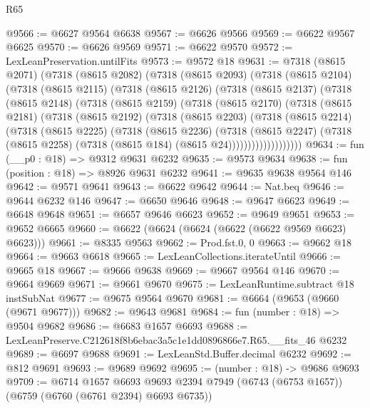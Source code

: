 \begin{lexlean}{R65}
\begin{coremodule}
{@9566 := @6627 @9564 @6638
@9567 := @6626 @9566
@9569 := @6622 @9567 @6625
@9570 := @6626 @9569
@9571 := @6622 @9570
@9572 := LexLeanPreservation.untilFits
@9573 := @9572 @18
@9631 := @7318
    (@8615 @2071)
    (@7318
      (@8615 @2082)
      (@7318
        (@8615 @2093)
        (@7318
          (@8615 @2104)
          (@7318
            (@8615 @2115)
            (@7318
              (@8615 @2126)
              (@7318
                (@8615 @2137)
                (@7318
                  (@8615 @2148)
                  (@7318
                    (@8615 @2159)
                    (@7318
                      (@8615 @2170)
                      (@7318
                        (@8615 @2181)
                        (@7318
                          (@8615 @2192)
                          (@7318
                            (@8615 @2203)
                            (@7318
                              (@8615 @2214)
                              (@7318
                                (@8615 @2225)
                                (@7318
                                  (@8615 @2236)
                                  (@7318
                                    (@8615 @2247)
                                    (@7318
                                      (@8615 @2258)
                                      (@7318 (@8615 @184) (@8615 @24)))))))))))))))))))
@9634 := fun (__p0 : @18) => @9312 @9631 @6232
@9635 := @9573 @9634
@9638 := fun (position : @18) => @8926 @9631 @6232
@9641 := @9635 @9638 @9564 @146
@9642 := @9571 @9641
@9643 := @6622 @9642
@9644 := Nat.beq
@9646 := @9644 @6232 @146
@9647 := @6650 @9646
@9648 := @9647 @6623
@9649 := @6648 @9648
@9651 := @6657 @9646 @6623
@9652 := @9649 @9651
@9653 := @9652 @6665
@9660 := @6622 (@6624 (@6624 (@6622 (@6622 @9569 @6623) @6623)))
@9661 := @8335 @9563
@9662 := Prod.fst.{0, 0}
@9663 := @9662 @18
@9664 := @9663 @6618
@9665 := LexLeanCollections.iterateUntil
@9666 := @9665 @18
@9667 := @9666 @9638
@9669 := @9667 @9564 @146
@9670 := @9664 @9669
@9671 := @9661 @9670
@9675 := LexLeanRuntime.subtract @18 instSubNat
@9677 := @9675 @9564 @9670
@9681 := @6664 (@9653 (@9660 (@9671 @9677)))
@9682 := @9643 @9681
@9684 := fun (number : @18) => @9504 @9682
@9686 := @6683 @1657 @6693
@9688 := LexLeanPreserve.C212618f8b6ebac3a5c1e1dd0896866e7.R65.__fits_46 @6232
@9689 := @6697 @9688
@9691 := LexLeanStd.Buffer.decimal @6232
@9692 := @812 @9691
@9693 := @9689 @9692
@9695 := (number : @18) -> @9686 @9693
@9709 := @6714
    @1657
    @6693
    @9693
    @2394
    @7949
    (@6743 (@6753 @1657))
    (@6759 (@6760 (@6761 @2394) @6693 @6735))
}
\end{coremodule}
\end{lexlean}
